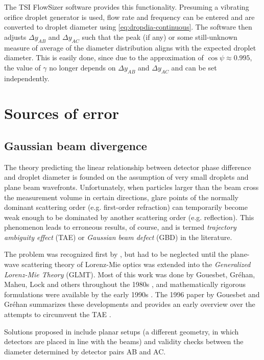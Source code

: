 \documentclass[11.5pt]{book}
\begin{document}
The TSI FlowSizer software provides this functionality. Presuming a vibrating
orifice droplet generator is used, flow rate and frequency can be entered and
are converted to droplet diameter using \eqref{eq:dropdia-continuous}. The
software then adjusts $\Delta y_{AB}$ and $\Delta y_{AC}$ such that the peak (if
any) or some still-unknown measure of average of the diameter distribution
aligns with the expected droplet diameter. This is easily done, since due to the
approximation of $\cos \psi \approx 0.995$, the value of $\gamma$ no longer
depends on $\Delta y_{AB}$ and $\Delta y_{AC}$ and can be set independently.


\section{Sources of error}
\subsection{Gaussian beam divergence}
The theory predicting the linear relationship between detector phase difference
and droplet diameter is founded on the assumption of very small droplets and
plane beam wavefronts. Unfortunately, when particles larger than the beam cross
the measurement volume in certain directions, glare points of the normally
dominant scattering order (e.g. first-order refraction) can temporarily become
weak enough to be dominated by another scattering order (e.g. reflection). This
phenomenon leads to erroneous results, of course, and is termed \emph{trajectory
ambiguity effect} (TAE) or \emph{Gaussian beam defect} (GBD) in the literature.

The problem was recognized first by \citet{Saffman86}, but had to be neglected until
the plane-wave scattering theory of Lorenz-Mie optics was extended into
the \emph{Generalized Lorenz-Mie Theory} (GLMT). Most of this work was
done by Gouesbet, Gréhan, Maheu, Lock and others throughout the 1980s
\cite{Grehan80, Gouesbet82, Gouesbet88, Maheu88}, and mathematically
rigorous formulations were available by the early 1990s \cite{Lock94,
Gouesbet94}. The 1996 paper by Gouesbet and Gréhan summarizes these developments
and provides an early overview over the attempts to circumvent the TAE
\cite{Gouesbet96}. 

Solutions proposed in \citet{Albrecht03} include planar setups (a different
geometry, in which detectors are placed in line with the beams) and validity
checks between the diameter determined by detector pairs AB and AC.
\end{document}
